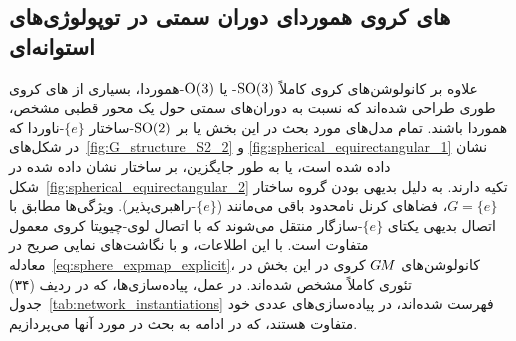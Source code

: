 

\subsection{های کروی هموردای دوران سمتی در توپولوژی‌های استوانه‌ای}
\label{sec:spherical_CNNs_azimuthal_equivariant}



علاوه بر کانولوشن‌های کروی کاملاً $\operatorname{SO}(3)$- یا $\operatorname{O}(3)$-هموردا، بسیاری از های کروی طوری طراحی شده‌اند که نسبت به دوران‌های سمتی حول یک محور قطبی مشخص، هموردا باشند.
تمام مدل‌های مورد بحث در این بخش یا بر $\operatorname{SO}(2)$-ساختار $\{e\}$-ناوردا که در شکل‌های~\ref{fig:G_structure_S2_2} و \ref{fig:spherical_equirectangular_1} نشان داده شده است، یا به طور جایگزین، بر ساختار نشان داده شده در شکل~\ref{fig:spherical_equirectangular_2} تکیه دارند.
به دلیل بدیهی بودن گروه ساختار $G=\{e\}$، فضاهای کرنل نامحدود باقی می‌مانند ($\{e\}$-راهبری‌پذیر).
ویژگی‌ها مطابق با اتصال بدیهی یکتای $\{e\}$-سازگار منتقل می‌شوند که با اتصال لوی-چیویتا کروی معمول متفاوت است.
با این اطلاعات، و با نگاشت‌های نمایی صریح در معادله~\eqref{eq:sphere_expmap_explicit}، کانولوشن‌های $G\mkern-1.4muM$ کروی در این بخش در تئوری کاملاً مشخص شده‌اند.
در عمل، پیاده‌سازی‌ها، که در ردیف (۳۴) جدول~\ref{tab:network_instantiations} فهرست شده‌اند، در پیاده‌سازی‌های عددی خود متفاوت هستند، که در ادامه به بحث در مورد آنها می‌پردازیم.


